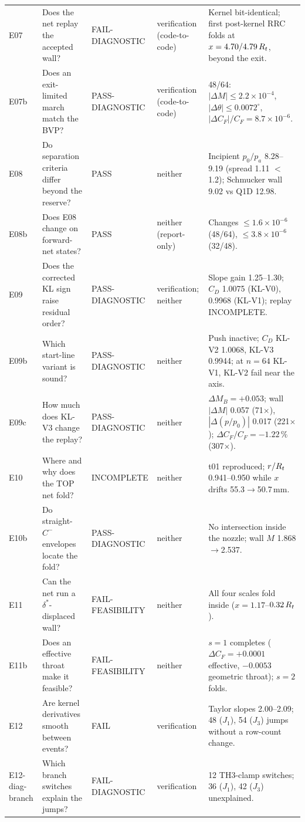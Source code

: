 {\begin{longtable}{@{}P{0.66in}P{1.36in}P{0.98in}P{1.00in}P{2.36in}@{}}
E07 & Does the net replay the accepted wall? & FAIL-DIAGNOSTIC & verification (code-to-code) & Kernel bit-identical; first post-kernel RRC folds at $x=4.70/4.79\,R_t$, beyond the exit.\\
E07b & Does an exit-limited march match the BVP? & PASS-DIAGNOSTIC & verification (code-to-code) & 48/64: $|\Delta M|\le2.2\times10^{-4}$, $|\Delta\theta|\le0.0072^\circ$, $|\Delta C_F|/C_F=8.7\times10^{-6}$.\\
E08 & Do separation criteria differ beyond the reserve? & PASS & neither & Incipient $p_0/p_a$ 8.28--9.19 (spread 1.11 $<$ 1.2); Schmucker wall 9.02 vs Q1D 12.98.\\
E08b & Does E08 change on forward-net states? & PASS & neither (report-only) & Changes $\le1.6\times10^{-6}$ (48/64), $\le3.8\times10^{-6}$ (32/48).\\
E09 & Does the corrected KL sign raise residual order? & PASS-DIAGNOSTIC & verification; neither & Slope gain 1.25--1.30; $C_D$ 1.0075 (KL-V0), 0.9968 (KL-V1); replay INCOMPLETE.\\
E09b & Which start-line variant is sound? & PASS-DIAGNOSTIC & neither & Push inactive; $C_D$ KL-V2 1.0068, KL-V3 0.9944; at $n=64$ KL-V1, KL-V2 fail near the axis.\\
E09c & How much does KL-V3 change the replay? & PASS-DIAGNOSTIC & neither & $\Delta M_B=+0.053$; wall $|\Delta M|$ 0.057 (71$\times$), $|\Delta(p/p_0)|$ 0.017 (221$\times$); $\Delta C_F/C_F=-1.22\,\%$ (307$\times$).\\
E10 & Where and why does the TOP net fold? & INCOMPLETE & neither & t01 reproduced; $r/R_t$ 0.941--0.950 while $x$ drifts 55.3$\to$50.7\,mm.\\
E10b & Do straight-$C^-$ envelopes locate the fold? & PASS-DIAGNOSTIC & neither & No intersection inside the nozzle; wall $M$ 1.868$\to$2.537.\\
E11 & Can the net run a $\delta^*$-displaced wall? & FAIL-FEASIBILITY & neither & All four scales fold inside ($x=1.17$--$0.32\,R_t$).\\
E11b & Does an effective throat make it feasible? & FAIL-FEASIBILITY & neither & $s=1$ completes ($\Delta C_F=+0.0001$ effective, $-0.0053$ geometric throat); $s=2$ folds.\\
E12 & Are kernel derivatives smooth between events? & FAIL & verification & Taylor slopes 2.00--2.09; 48 ($J_1$), 54 ($J_3$) jumps without a row-count change.\\
E12-diag-\allowbreak branch & Which branch switches explain the jumps? & FAIL-DIAGNOSTIC & verification & 12 TH3-clamp switches; 36 ($J_1$), 42 ($J_3$) unexplained.\\

\end{longtable}}
